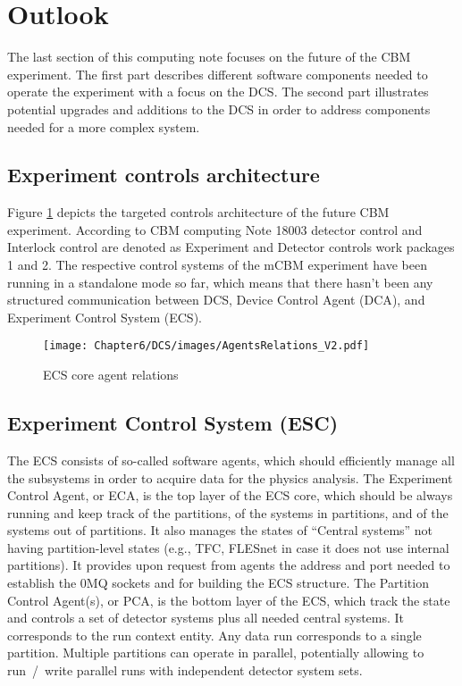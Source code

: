 \newpage
\section{Outlook}
The last section of this computing note focuses on the future of the CBM experiment. The first part describes different software components needed to operate the experiment with a focus on the \gls{DCS}. The second part illustrates potential upgrades and additions to the DCS in order to address components needed for a more complex system.
\subsection{Experiment controls architecture}
Figure \ref{fig_sim} depicts the targeted controls architecture of the future CBM experiment. According to CBM computing Note 18003 \cite{CBM_definitions} detector control and Interlock control are denoted as Experiment and Detector controls work packages 1 and 2. The respective control systems of the \gls{mCBM} experiment have been running in a standalone mode so far, which means that there hasn't been any structured communication between DCS, Device Control Agent (\gls{DCA}), and Experiment Control System (\gls{ECS}).

\begin{figure}[h!]
\centering
\texttt{[image: Chapter6/DCS/images/AgentsRelations\_V2.pdf]}
\caption{ECS core agent relations}
\label{fig_sim}
\end{figure}

\subsection{Experiment Control System (ESC)}\label{sssAgents}
The ECS consists of so-called software agents, which should efficiently manage all the subsystems in order to acquire data for the physics analysis.
The Experiment Control Agent, or ECA, is the top layer of the ECS core, which should be always running and keep track of 
the partitions, of the systems in partitions, and of the systems out of partitions.  It also manages the states of ``Central systems'' not having partition-level states (e.g., \gls{TFC}, FLESnet in case it does 
not use internal partitions). It provides upon request from agents the address and port needed to establish the 0MQ sockets and for building the 
ECS structure. The Partition Control Agent(s), or \gls{PCA}, is the bottom layer of the ECS, which track the state and controls a set of 
detector systems plus all needed central systems. It corresponds to the run context entity.  Any data run corresponds to a single partition. 
Multiple partitions can operate in parallel, potentially allowing to run~/~write parallel runs with independent 
detector system sets. 

